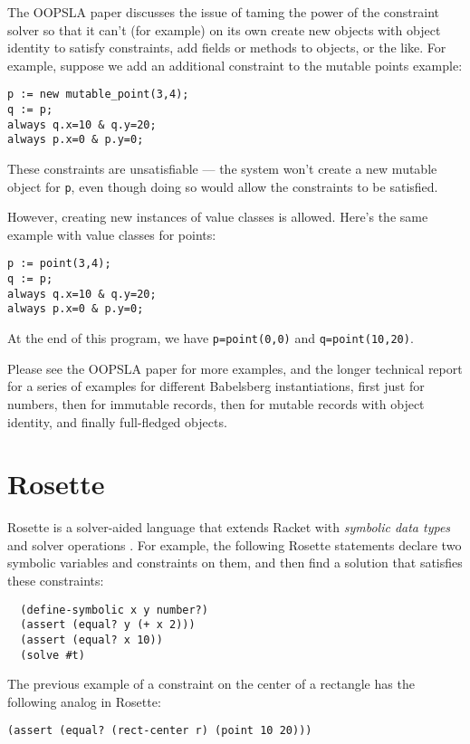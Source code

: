\documentclass{article}
\begin{document}
The OOPSLA paper discusses the issue of taming the power of the
constraint solver so that it can't (for example) on its own create new
objects with object identity to satisfy constraints, add fields or
methods to objects, or the like.  For example, suppose we add an
additional constraint to the mutable points example:
\begin{verbatim}
p := new mutable_point(3,4);
q := p;
always q.x=10 & q.y=20;
always p.x=0 & p.y=0;
\end{verbatim}
These constraints are unsatisfiable --- the system won't create a new
mutable object for \verb|p|, even though doing so would allow the
constraints to be satisfied.

However, creating new instances of value classes is allowed.  Here's
the same example with value classes for points:
\begin{verbatim}
p := point(3,4);
q := p;
always q.x=10 & q.y=20;
always p.x=0 & p.y=0;
\end{verbatim}

At the end of this program, we have \verb|p=point(0,0)| and
\verb|q=point(10,20)|.

Please see the OOPSLA paper for more examples, and the longer
technical report for a series of examples for different Babelsberg
instantiations, first just for numbers, then for immutable records,
then for mutable records with object identity, and finally
full-fledged objects.

\section{Rosette}
\label{sec:rosette}

Rosette is a solver-aided language that extends Racket with
\emph{symbolic data types} and solver operations
\cite{torlak-onward-2013,torlak-pldi-2014}.  For example, the
following Rosette statements declare two symbolic variables and
constraints on them, and then find a solution that satisfies these
constraints:
\begin{verbatim}
  (define-symbolic x y number?)
  (assert (equal? y (+ x 2)))
  (assert (equal? x 10))
  (solve #t)
\end{verbatim}

The previous example of a constraint on the center of a rectangle has
the following analog in Rosette:

\begin{verbatim}
(assert (equal? (rect-center r) (point 10 20)))
\end{verbatim}
\end{document}
